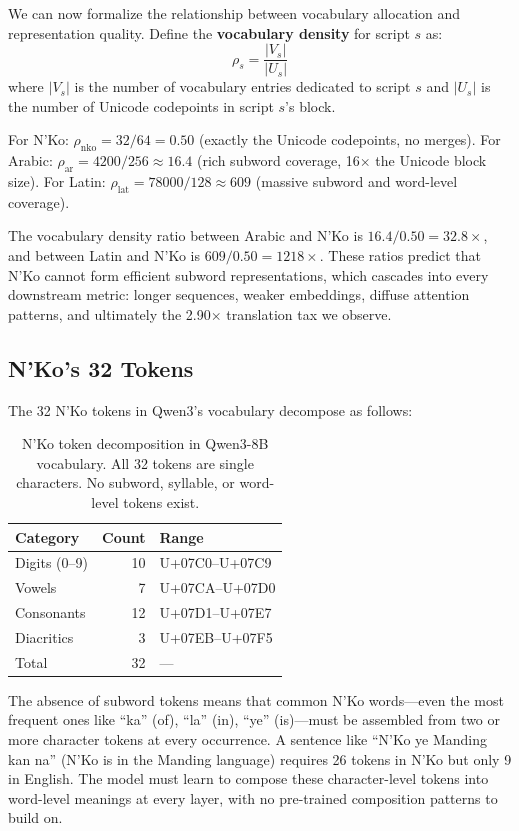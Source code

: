 \documentclass[11pt]{article}
\begin{document}
We can now formalize the relationship between vocabulary allocation and representation quality.
Define the \textbf{vocabulary density} for script $s$ as:
\begin{equation}
\rho_s = \frac{|V_s|}{|U_s|}
\end{equation}
where $|V_s|$ is the number of vocabulary entries dedicated to script $s$ and $|U_s|$ is the number of Unicode codepoints in script $s$'s block.

For N'Ko: $\rho_{\text{nko}} = 32/64 = 0.50$ (exactly the Unicode codepoints, no merges).
For Arabic: $\rho_{\text{ar}} = 4200/256 \approx 16.4$ (rich subword coverage, 16$\times$ the Unicode block size).
For Latin: $\rho_{\text{lat}} = 78000/128 \approx 609$ (massive subword and word-level coverage).

The vocabulary density ratio between Arabic and N'Ko is $16.4 / 0.50 = 32.8\times$, and between Latin and N'Ko is $609 / 0.50 = 1218\times$.
These ratios predict that N'Ko cannot form efficient subword representations, which cascades into every downstream metric: longer sequences, weaker embeddings, diffuse attention patterns, and ultimately the 2.90$\times$ translation tax we observe.

\subsection{N'Ko's 32 Tokens}

The 32 N'Ko tokens in Qwen3's vocabulary decompose as follows:

\begin{table}[t]
\centering
\small
\begin{tabular}{lrl}
\toprule
\textbf{Category} & \textbf{Count} & \textbf{Range} \\
\midrule
Digits (0--9) & 10 & U+07C0--U+07C9 \\
Vowels & 7 & U+07CA--U+07D0 \\
Consonants & 12 & U+07D1--U+07E7 \\
Diacritics & 3 & U+07EB--U+07F5 \\
\midrule
Total & 32 & --- \\
\bottomrule
\end{tabular}
\caption{N'Ko token decomposition in Qwen3-8B vocabulary. All 32 tokens are single characters. No subword, syllable, or word-level tokens exist.}
\label{tab:nko-tokens}
\end{table}

The absence of subword tokens means that common N'Ko words---even the most frequent ones like ``ka'' (of), ``la'' (in), ``ye'' (is)---must be assembled from two or more character tokens at every occurrence.
A sentence like ``N'Ko ye Manding kan na'' (N'Ko is in the Manding language) requires 26 tokens in N'Ko but only 9 in English.
The model must learn to compose these character-level tokens into word-level meanings at every layer, with no pre-trained composition patterns to build on.
\end{document}
